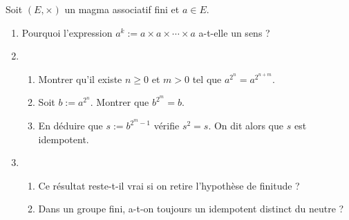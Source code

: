 
Soit $(E, \times)$ un magma associatif fini et $a \in E$.

\begin{enumerate}

\item Pourquoi l'expression $a^k := a \times a \times \cdots \times a$ a-t-elle un sens ?

\item \begin{enumerate} \item Montrer qu'il existe $n \ge 0 $ et $m > 0$ tel que $a^{2^n} = a^{2^{n+m}}$.

\item Soit $b := a^{2^{n}}$. Montrer que $b^{2^{m}} = b$. 

\item En déduire que $s := b^{2^{m}-1}$ vérifie $s^2 = s$. On dit alors que $s$ est idempotent.

\end{enumerate}

\item \begin{enumerate}

\item Ce résultat reste-t-il vrai si on retire l'hypothèse de finitude ?

\item Dans un groupe fini, a-t-on toujours un idempotent distinct du neutre ?

\end{enumerate}

\end{enumerate}





